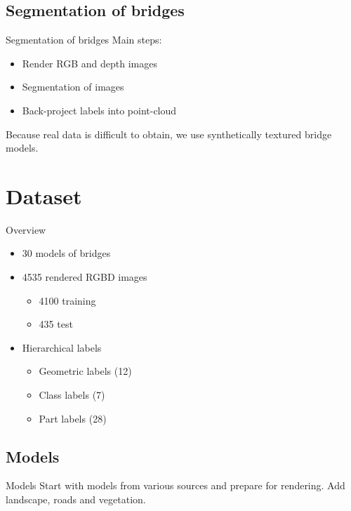 \documentclass{beamer}
\begin{document}
\subsection{Segmentation of bridges}

\begin{frame}{Segmentation of bridges}
  Main steps:
  \begin{itemize}
  \item Render RGB and depth images
  \item Segmentation of images
  \item Back-project labels into point-cloud
  \end{itemize}
  Because real data is difficult to obtain, we use synthetically
  textured bridge models.
\end{frame}

\section{Dataset}

\begin{frame}{Overview}
  \begin{itemize}
  \item 30 models of bridges
  \item 4535 rendered RGBD images
    \begin{itemize}
    \item 4100 training
    \item 435 test
    \end{itemize}
  \item Hierarchical labels
    \begin{itemize}
    \item Geometric labels (12)
    \item Class labels (7)
    \item Part labels (28)
    \end{itemize}
  \end{itemize}
\end{frame}

\subsection{Models}

\begin{frame}{Models}
  Start with models from various sources and prepare for
  rendering. Add landscape, roads and vegetation.

  \begin{figure}[h]\centering
    
  \end{figure}
\end{frame}
\end{document}
